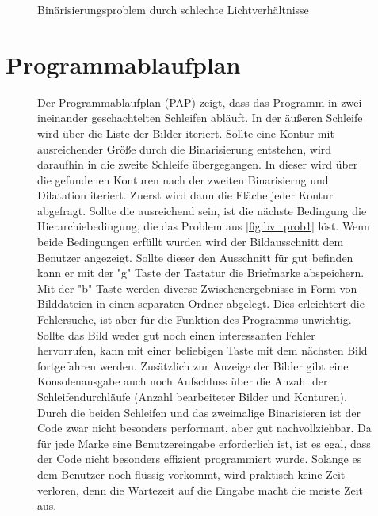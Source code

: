 \documentclass[12pt,toc=bib,toc=listof]{scrreprt}
\begin{document}
\begin{figure}[h]
\begin{minipage}[t]{.2\linewidth}
  \caption{Binärisierungsproblem durch schlechte Lichtverhältnisse}
  \label{fig:bv_prob3}
\end{minipage}
\end{figure}


\section{Programmablaufplan}
\label{sec_bv:pap}
\begin{figure}[h]
\begin{minipage}[t]{.62\linewidth}
Der Programmablaufplan (PAP) zeigt, dass das Programm in zwei ineinander geschachtelten Schleifen abläuft. In der äußeren Schleife wird über die Liste der Bilder iteriert. Sollte eine Kontur mit ausreichender Größe durch die Binarisierung entstehen, wird daraufhin in die zweite Schleife übergegangen. In dieser wird über die gefundenen Konturen nach der zweiten Binarisierng und Dilatation iteriert. Zuerst wird dann die Fläche jeder Kontur abgefragt. Sollte die ausreichend sein, ist die nächste Bedingung die Hierarchiebedingung, die das Problem aus \ref{fig:bv_prob1} löst. Wenn beide Bedingungen erfüllt wurden wird der Bildausschnitt dem Benutzer angezeigt. Sollte dieser den Ausschnitt für gut befinden kann er mit der "g" Taste der Tastatur die Briefmarke abspeichern. Mit der "b" Taste werden diverse Zwischenergebnisse in Form von Bilddateien in einen separaten Ordner abgelegt. Dies erleichtert die Fehlersuche, ist aber für die Funktion des Programms unwichtig. Sollte das Bild weder gut noch einen interessanten Fehler hervorrufen, kann mit einer beliebigen Taste mit dem nächsten Bild fortgefahren werden. Zusätzlich zur Anzeige der Bilder gibt eine Konsolenausgabe auch noch Aufschluss über die Anzahl der Schleifendurchläufe (Anzahl bearbeiteter Bilder und Konturen). Durch die beiden Schleifen und das zweimalige Binarisieren ist der Code zwar nicht besonders performant, aber gut nachvollziehbar. Da für jede Marke eine Benutzereingabe erforderlich ist, ist es egal, dass der Code nicht besonders effizient programmiert wurde. Solange es dem Benutzer noch flüssig vorkommt, wird praktisch keine Zeit verloren, denn die Wartezeit auf die Eingabe macht die meiste Zeit aus.
\end{minipage}
\hfill
\begin{minipage}[t]{.33\linewidth}
\strut\vspace*{-\baselineskip}
\newline

\end{minipage}
\end{figure}
\end{document}
